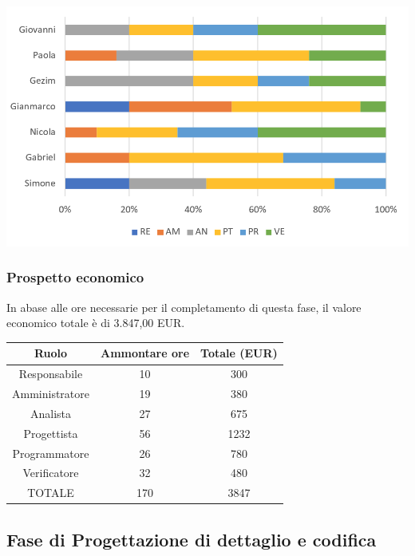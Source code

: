 \includegraphics[width=\textwidth]{res/img/hi33}

\subsubsection{Prospetto economico}
In abase alle ore necessarie per il completamento di questa fase, il valore economico totale è di 3.847,00 EUR.
\begin{center}
\begin{tabular}{ |c|c|c|  }
 \hline
 Ruolo 		& Ammontare ore 	& Totale (EUR)\\
 	\hline
 \hline
 	Responsabile	& 10 		& 300\\
	Amministratore	& 19		& 380\\
	Analista		& 27 	& 675\\
	Progettista		& 56		& 1232\\
	Programmatore	& 26		& 780\\
	Verificatore	& 32 	& 480\\
 \hline\hline
 TOTALE		& 170		& 3847\\
  \hline
\end{tabular}
\end{center}

\newpage
\subsection{Fase di Progettazione di dettaglio e codifica}

